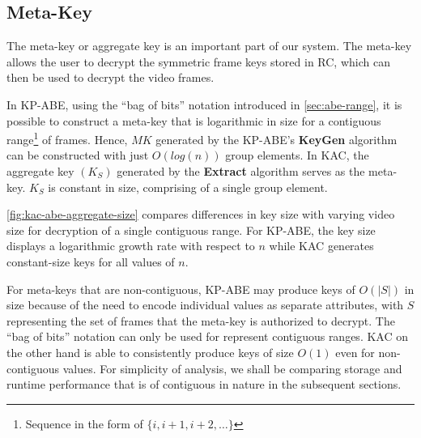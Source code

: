 \documentclass[hyp,a4paper,12pt,openbib]{socreport}
\begin{document}
\subsection{Meta-Key}
\label{sec:meta-key-store}

The meta-key or aggregate key is an important part of our system. The meta-key allows the user to decrypt the symmetric frame keys stored in RC, which can then be used to decrypt the video frames.
 
In KP-ABE, using the ``bag of bits'' notation introduced in \cref{sec:abe-range}, it is possible to construct a meta-key that is  logarithmic in size for a contiguous range\footnote{Sequence in the form of $\{i,i+1,i+2, \dots\}$} of frames. Hence, $MK$ generated by the KP-ABE's \textbf{KeyGen} algorithm can be constructed with just $O(log(n))$ group elements. In KAC, the aggregate key $(K_S)$ generated by the \textbf{Extract} algorithm serves as the meta-key. $K_S$ is constant in size, comprising of a single group element. 

\cref{fig:kac-abe-aggregate-size} compares differences in key size with varying video size for decryption of a single contiguous range. For KP-ABE, the key size displays a logarithmic growth rate with respect to $n$ while KAC generates constant-size keys for all values of $n$. 

For meta-keys that are non-contiguous,  KP-ABE may produce keys of $O(|S|)$ in size because of the need to encode individual values as separate attributes, with $S$ representing the set of frames that the meta-key is authorized to decrypt. The ``bag of bits'' notation can only be used for represent contiguous ranges.  KAC on the other hand is able to consistently produce keys of size $O(1)$ even for non-contiguous values. For simplicity of analysis, we shall be comparing storage and runtime performance that is of contiguous in nature in the subsequent sections.
\end{document}
